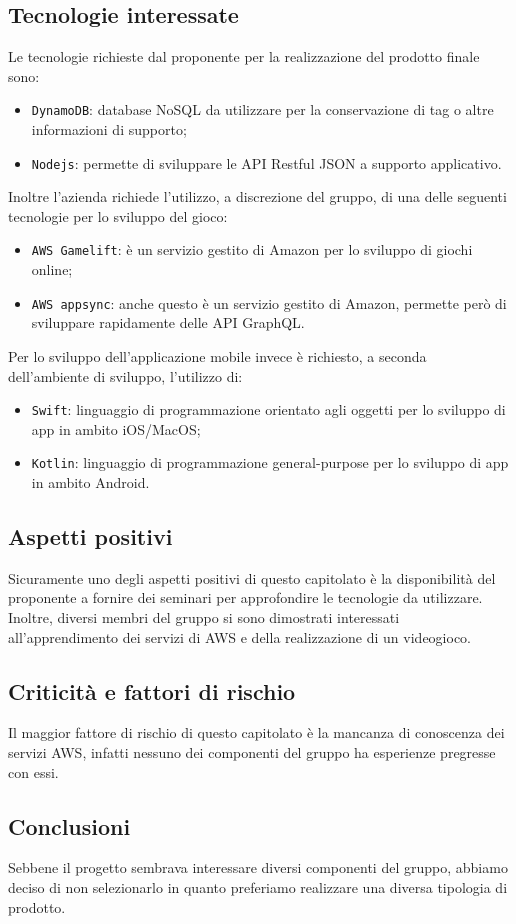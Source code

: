 \subsection{Tecnologie interessate}
Le tecnologie richieste dal proponente per la realizzazione del prodotto finale sono:
\begin{itemize}
	\item \verb|DynamoDB|: database NoSQL da utilizzare per la conservazione di tag o altre informazioni di supporto;
	\item \verb|Nodejs|: permette di sviluppare le API Restful JSON a supporto applicativo.
\end{itemize}
Inoltre l'azienda richiede l'utilizzo, a discrezione del gruppo, di una delle seguenti tecnologie per lo sviluppo del gioco:
\begin{itemize}
	\item \verb|AWS Gamelift|: è un servizio gestito di Amazon per lo sviluppo di giochi online;
	\item \verb|AWS appsync|: anche questo è un servizio gestito di Amazon, permette però di sviluppare rapidamente delle API GraphQL.
\end{itemize}
Per lo sviluppo dell'applicazione mobile invece è richiesto, a seconda dell'ambiente di sviluppo, l'utilizzo di:
\begin{itemize}
	\item \verb|Swift|: linguaggio di programmazione orientato agli oggetti per lo sviluppo di app in ambito iOS/MacOS;
	\item \verb|Kotlin|: linguaggio di programmazione general-purpose per lo sviluppo di app in ambito Android.
\end{itemize}


\subsection{Aspetti positivi}
Sicuramente uno degli aspetti positivi di questo capitolato è la disponibilità del proponente a fornire dei seminari per approfondire le tecnologie da utilizzare.
Inoltre, diversi membri del gruppo si sono dimostrati interessati all'apprendimento dei servizi di AWS e della realizzazione di un videogioco.


\subsection{Criticità e fattori di rischio}
Il maggior fattore di rischio di questo capitolato è la mancanza di conoscenza dei servizi AWS, infatti nessuno dei componenti del gruppo ha esperienze pregresse con essi.


\subsection{Conclusioni}
Sebbene il progetto sembrava interessare diversi componenti del gruppo, abbiamo deciso di non selezionarlo in quanto preferiamo realizzare una diversa tipologia di prodotto.
\newpage
